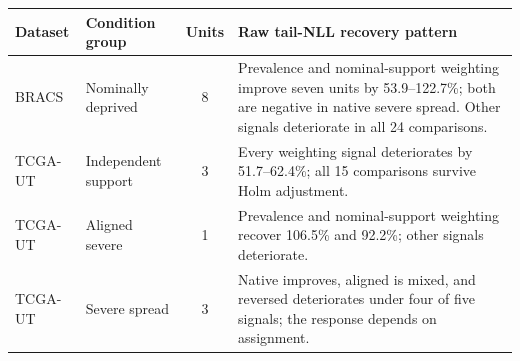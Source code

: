 \begin{tabularx}{\textwidth}{@{}l l c X@{}}
\toprule
Dataset & Condition group & Units & Raw tail-NLL recovery pattern \\
\midrule
BRACS & Nominally deprived & 8 & Prevalence and nominal-support weighting improve seven units by \num{53.9}--\num{122.7}\%; both are negative in native severe spread. Other signals deteriorate in all \num{24} comparisons. \\
TCGA-UT & Independent support & 3 & Every weighting signal deteriorates by \num{51.7}--\num{62.4}\%; all \num{15} comparisons survive Holm adjustment. \\
TCGA-UT & Aligned severe & 1 & Prevalence and nominal-support weighting recover \num{106.5}\% and \num{92.2}\%; other signals deteriorate. \\
TCGA-UT & Severe spread & 3 & Native improves, aligned is mixed, and reversed deteriorates under four of five signals; the response depends on assignment. \\
\bottomrule
\end{tabularx}
